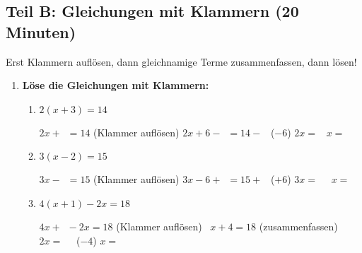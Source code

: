 \subsection*{Teil B: Gleichungen mit Klammern (20 Minuten)}

\begin{warnbox}[Achtung!]
    Erst Klammern auflösen, dann gleichnamige Terme zusammenfassen, dann lösen!
\end{warnbox}

\begin{enumerate}[label=\arabic*., resume]

    \item \textbf{Löse die Gleichungen mit Klammern:}

    \vspace{0.5cm}

    \begin{enumerate}[label=\alph*)]
        \item $2(x + 3) = 14$

        \vspace{0.3cm}
        $2x + \phantom{0} = 14$ \quad (Klammer auflösen)
        \vspace{0.3cm}
        $2x + 6 - \phantom{0} = 14 - \phantom{0}$ \quad ($-6$)
        \vspace{0.3cm}
        $2x = \phantom{0}$
        \vspace{0.3cm}
        $x = $ \underline{\hspace{2cm}}

        \vspace{1cm}

        \item $3(x - 2) = 15$

        \vspace{0.3cm}
        $3x - \phantom{0} = 15$ \quad (Klammer auflösen)
        \vspace{0.3cm}
        $3x - 6 + \phantom{0} = 15 + \phantom{0}$ \quad ($+6$)
        \vspace{0.3cm}
        $3x = \phantom{00}$
        \vspace{0.3cm}
        $x = $ \underline{\hspace{2cm}}

        \vspace{1cm}

        \item $4(x + 1) - 2x = 18$

        \vspace{0.3cm}
        $4x + \phantom{0} - 2x = 18$ \quad (Klammer auflösen)
        \vspace{0.3cm}
        $\phantom{0}x + 4 = 18$ \quad (zusammenfassen)
        \vspace{0.3cm}
        $2x = \phantom{00}$ \quad ($-4$)
        \vspace{0.3cm}
        $x = $ \underline{\hspace{2cm}}


\end{enumerate}
\end{enumerate}
